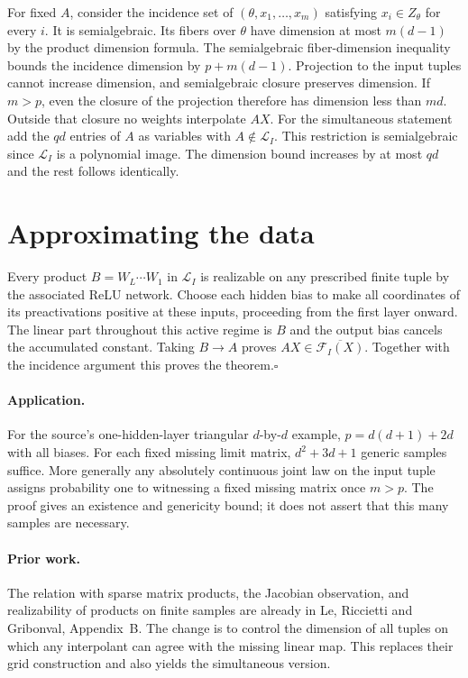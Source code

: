 \documentclass[11pt]{article}
\begin{document}
For fixed $A$, consider the incidence set of $(\theta,x_1,\ldots,x_m)$ satisfying $x_i\in Z_\theta$ for every $i$. It is semialgebraic. Its fibers over $\theta$ have dimension at most $m(d-1)$ by the product dimension formula. The semialgebraic fiber-dimension inequality bounds the incidence dimension by $p+m(d-1)$. Projection to the input tuples cannot increase dimension, and semialgebraic closure preserves dimension. If $m>p$, even the closure of the projection therefore has dimension less than $md$. Outside that closure no weights interpolate $AX$. For the simultaneous statement add the $qd$ entries of $A$ as variables with $A\notin\mathcal L_I$. This restriction is semialgebraic since $\mathcal L_I$ is a polynomial image. The dimension bound increases by at most $qd$ and the rest follows identically.

\section*{Approximating the data}
Every product $B=W_L\cdots W_1$ in $\mathcal L_I$ is realizable on any prescribed finite tuple by the associated ReLU network. Choose each hidden bias to make all coordinates of its preactivations positive at these inputs, proceeding from the first layer onward. The linear part throughout this active regime is $B$ and the output bias cancels the accumulated constant. Taking $B\to A$ proves $AX\in\overline{\mathcal F_I(X)}$. Together with the incidence argument this proves the theorem.\hfill$\square$

\paragraph{Application.} For the source's one-hidden-layer triangular $d$-by-$d$ example, $p=d(d+1)+2d$ with all biases. For each fixed missing limit matrix, $d^2+3d+1$ generic samples suffice. More generally any absolutely continuous joint law on the input tuple assigns probability one to witnessing a fixed missing matrix once $m>p$. The proof gives an existence and genericity bound; it does not assert that this many samples are necessary.

\paragraph{Prior work.} The relation with sparse matrix products, the Jacobian observation, and realizability of products on finite samples are already in Le, Riccietti and Gribonval, Appendix~B. The change is to control the dimension of all tuples on which any interpolant can agree with the missing linear map. This replaces their grid construction and also yields the simultaneous version.
\end{document}
